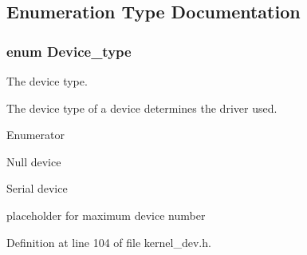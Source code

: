 \subsection{Enumeration Type Documentation}
\hypertarget{group__dev_ga879ceac20e83b2375e5b49f4379b0c90}{
\subsubsection[{Device\-\_\-type}]{\setlength{\rightskip}{0pt plus 5cm}enum {\bf Device\-\_\-type}}}\label{group__dev_ga879ceac20e83b2375e5b49f4379b0c90}


The device type. 

The device type of a device determines the driver used. \begin{Desc}
\item[Enumerator]\par
\begin{description}
\item[{\em 
\hypertarget{group__dev_gga879ceac20e83b2375e5b49f4379b0c90a8ca9ed7c2fc080b6706582ccf828b08f}{D\-E\-V\-\_\-\-N\-U\-L\-L}\label{group__dev_gga879ceac20e83b2375e5b49f4379b0c90a8ca9ed7c2fc080b6706582ccf828b08f}
}]Null device \item[{\em 
\hypertarget{group__dev_gga879ceac20e83b2375e5b49f4379b0c90adb43c91cf279ccd4510abaed9425bacc}{D\-E\-V\-\_\-\-S\-E\-R\-I\-A\-L}\label{group__dev_gga879ceac20e83b2375e5b49f4379b0c90adb43c91cf279ccd4510abaed9425bacc}
}]Serial device \item[{\em 
\hypertarget{group__dev_gga879ceac20e83b2375e5b49f4379b0c90a4d07dfbc7e68d26e2d92773a37381ce7}{D\-E\-V\-\_\-\-M\-A\-X}\label{group__dev_gga879ceac20e83b2375e5b49f4379b0c90a4d07dfbc7e68d26e2d92773a37381ce7}
}]placeholder for maximum device number \end{description}
\end{Desc}


Definition at line 104 of file kernel\-\_\-dev.\-h.



